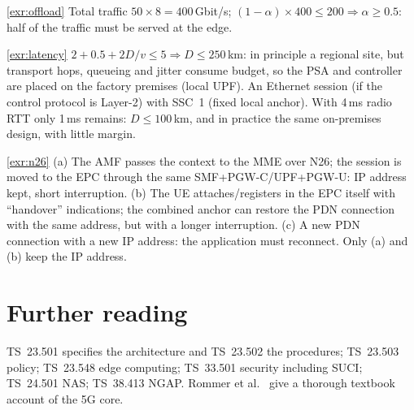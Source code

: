 \documentclass[11pt,a4paper]{article}
\begin{document}
\begin{solutionbox}{\ref{exr:offload}}
Total traffic $50\times8 = 400$\,Gbit/s; $(1-\alpha)\times400 \le 200 \Rightarrow \alpha \ge 0.5$: half of the traffic must be served at the edge.
\end{solutionbox}

\begin{solutionbox}{\ref{exr:latency}}
$2 + 0.5 + 2D/v \le 5 \Rightarrow D \le 250$\,km: in principle a regional site, but transport hops, queueing and jitter consume budget, so the PSA
and controller are placed on the factory premises (local UPF). An Ethernet session (if the control protocol is Layer-2) with SSC~1 (fixed
local anchor). With 4\,ms radio RTT only 1\,ms remains: $D \le 100$\,km, and in practice the same on-premises design, with little margin.
\end{solutionbox}

\begin{solutionbox}{\ref{exr:n26}}
(a) The AMF passes the context to the MME over N26; the session is moved to the EPC through the same SMF+PGW-C/UPF+PGW-U: IP address
kept, short interruption. (b) The UE attaches/registers in the EPC itself with ``handover'' indications; the combined anchor can restore the
PDN connection with the same address, but with a longer interruption. (c) A new PDN connection with a new IP address: the application must
reconnect. Only (a) and (b) keep the IP address.
\end{solutionbox}

\section{Further reading}
TS~23.501 \cite{ts23501} specifies the architecture and TS~23.502 \cite{ts23502} the procedures; TS~23.503 \cite{ts23503} policy;
TS~23.548 \cite{ts23548} edge computing; TS~33.501 \cite{ts33501} security including SUCI; TS~24.501 \cite{ts24501} NAS; TS~38.413
\cite{ts38413} NGAP. Rommer et al.\ \cite{rommer2020core} give a thorough textbook account of the 5G core.

\printbibliography[heading=subbibliography,title={\ACNstrRefs}]
\end{document}
